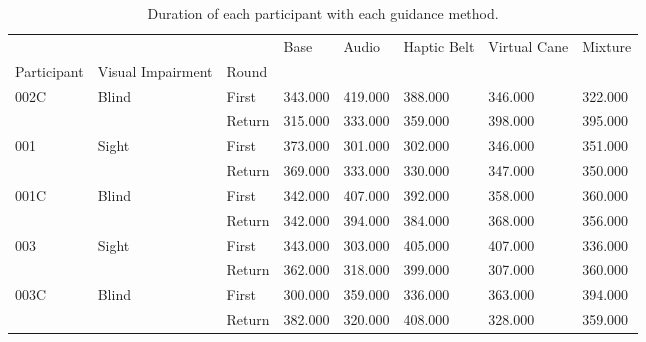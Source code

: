 
\begin{table}[!htb]
\centering
\caption{Duration of each participant with each guidance method.}
\label{tab:duration}
\begin{tabular}{llllllll}
\toprule
     &       &        &    Base &   Audio & Haptic Belt & Virtual Cane & Mixture \\
Participant & Visual Impairment & Round &         &         &             &              &         \\
\midrule
002C & Blind & First & 343.000 & 419.000 &     388.000 &      346.000 & 322.000 \\
     &       & Return & 315.000 & 333.000 &     359.000 &      398.000 & 395.000 \\
001 & Sight & First & 373.000 & 301.000 &     302.000 &      346.000 & 351.000 \\
     &       & Return & 369.000 & 333.000 &     330.000 &      347.000 & 350.000 \\
001C & Blind & First & 342.000 & 407.000 &     392.000 &      358.000 & 360.000 \\
     &       & Return & 342.000 & 394.000 &     384.000 &      368.000 & 356.000 \\
003 & Sight & First & 343.000 & 303.000 &     405.000 &      407.000 & 336.000 \\
     &       & Return & 362.000 & 318.000 &     399.000 &      307.000 & 360.000 \\
003C & Blind & First & 300.000 & 359.000 &     336.000 &      363.000 & 394.000 \\
     &       & Return & 382.000 & 320.000 &     408.000 &      328.000 & 359.000 \\
\bottomrule
\end{tabular}
\end{table}

